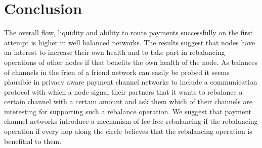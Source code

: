 \documentclass[a4paper]{paper}
\begin{document}
\section{Conclusion}
The overall flow, liquidity and ability to route payments successfully on the first attempt is higher in well balanced networks. 
The results suggest that nodes have an interest to increase their own health and to take part in rebalancing operations of other nodes if that benefits the own health of the node.
As balances of channels in the frien of a friend network can easily be probed it seems plausible in privacy aware payment channel networks to include a communication protocol with which a node signal their partners that it wants to rebalance a certain channel with a certain amount and ask them which of their channels are interesting for supporting such a rebalance operation.
We suggest that payment channel networks introduce a mechanism of fee free rebalancing if the rebalancing operation if every hop along the circle believes that the rebalancing operation is benefitial to them. 




\end{document}
